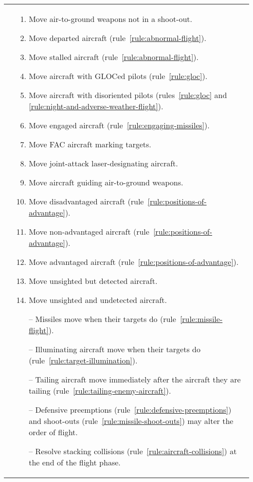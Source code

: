 \begin{twocolumntable}
\begin{tabularx}{1.0\linewidth}{L@{\hspace{\columnsep}}L}
{&

\begin{enumerate}[start=7]


\begin{enumerate}[nosep]
    \item Move air-to-ground weapons not in a shoot-out.
    \item Move departed aircraft (rule~\ref{rule:abnormal-flight}).
    \item Move stalled aircraft (rule~\ref{rule:abnormal-flight}).
    \item Move aircraft with GLOCed pilots (rule~\ref{rule:gloc}).
    \item Move aircraft with disoriented pilots (rules~\ref{rule:gloc} and \ref{rule:night-and-adverse-weather-flight}).
    \item Move engaged aircraft (rule~\ref{rule:engaging-missiles}).
    \item Move FAC aircraft marking targets.
    \item Move joint-attack laser-designating aircraft.
    \item Move aircraft guiding air-to-ground weapons.
    \item Move disadvantaged aircraft (rule~\ref{rule:positions-of-advantage}).
    \item Move non-advantaged aircraft (rule~\ref{rule:positions-of-advantage}).
    \item Move advantaged aircraft (rule~\ref{rule:positions-of-advantage}).
    \item Move unsighted but detected aircraft.
    \item Move unsighted and undetected aircraft.
    \item[--] Missiles move when their targets do (rule~\ref{rule:missile-flight}).
    \item[--] Illuminating aircraft move when their targets do (rule~\ref{rule:target-illumination}).
    \item[--] Tailing aircraft move immediately after the aircraft they are tailing (rule~\ref{rule:tailing-enemy-aircraft}).
    \item[--] Defensive preemptions (rule~\ref{rule:defensive-preemptions})  and shoot-outs (rule~\ref{rule:missile-shoot-outs}) may alter the order of flight.
    \item[--] Resolve stacking collisions (rule~\ref{rule:aircraft-collisions}) at the end of the flight phase.
\end{enumerate}


\end{enumerate}}
\end{tabularx}
\end{twocolumntable}
